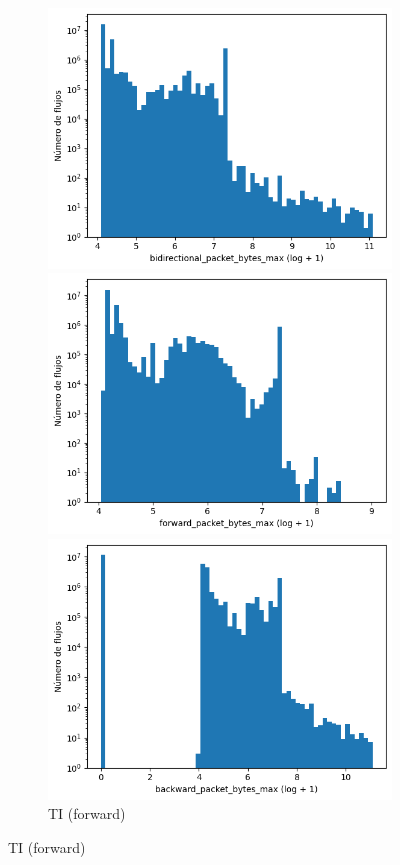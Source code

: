 \begin{figure}[H]
\begin{subfigure}[b]{0.26\textwidth}
        \includegraphics[width=\linewidth]{media/packet_pincer_toniot/bidirectional_packet_bytes_max_log_x_log_y.png}
        \caption{TI (bidir.)}
        \includegraphics[width=\textwidth]{media/packet_pincer_toniot/forward_packet_bytes_max_log_x_log_y.png}
        \caption{TI (forward)}
        \includegraphics[width=\textwidth]{media/packet_pincer_toniot/backward_packet_bytes_max_log_x_log_y.png}

\end{subfigure}
\end{figure}
